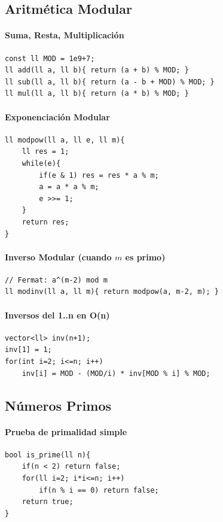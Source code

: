 \documentclass{article}
\begin{document}
\subsection{Aritmética Modular}

\paragraph{Suma, Resta, Multiplicación}
\begin{lstlisting}[style=cppstyle]
const ll MOD = 1e9+7;
ll add(ll a, ll b){ return (a + b) % MOD; }
ll sub(ll a, ll b){ return (a - b + MOD) % MOD; }
ll mul(ll a, ll b){ return (a * b) % MOD; }
\end{lstlisting}

\paragraph{Exponenciación Modular}
\begin{lstlisting}[style=cppstyle]
ll modpow(ll a, ll e, ll m){
    ll res = 1;
    while(e){
        if(e & 1) res = res * a % m;
        a = a * a % m;
        e >>= 1;
    }
    return res;
}
\end{lstlisting}

\paragraph{Inverso Modular (cuando \(m\) es primo)}
\begin{lstlisting}[style=cppstyle]
// Fermat: a^(m-2) mod m
ll modinv(ll a, ll m){ return modpow(a, m-2, m); }
\end{lstlisting}

\paragraph{Inversos del 1..n en O(n)}
\begin{lstlisting}[style=cppstyle]
vector<ll> inv(n+1);
inv[1] = 1;
for(int i=2; i<=n; i++)
    inv[i] = MOD - (MOD/i) * inv[MOD % i] % MOD;
\end{lstlisting}


\subsection{Números Primos}

\paragraph{Prueba de primalidad simple}
\begin{lstlisting}[style=cppstyle]
bool is_prime(ll n){
    if(n < 2) return false;
    for(ll i=2; i*i<=n; i++)
        if(n % i == 0) return false;
    return true;
}
\end{lstlisting}
\end{document}
